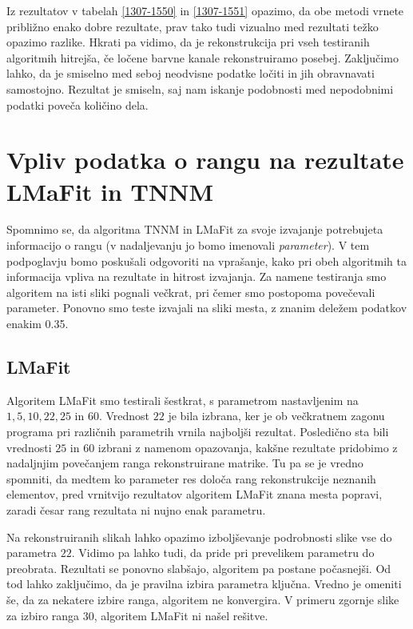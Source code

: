 \FloatBarrier

Iz rezultatov v  tabelah \ref{1307-1550} in \ref{1307-1551} opazimo, da obe metodi vrnete približno enako dobre rezultate, 
prav tako tudi vizualno med rezultati težko opazimo razlike.
Hkrati pa vidimo, da je rekonstrukcija pri vseh testiranih algoritmih hitrejša, če ločene barvne kanale rekonstruiramo posebej.  Zaključimo lahko, da je smiselno med seboj neodvisne podatke ločiti in jih obravnavati samostojno. Rezultat je smiseln, saj nam iskanje podobnosti med nepodobnimi podatki poveča količino dela.

\section{Vpliv podatka o rangu na rezultate LMaFit in TNNM} \label{1307-2253}
Spomnimo se, da algoritma TNNM in LMaFit za svoje izvajanje potrebujeta informacijo o rangu (v nadaljevanju jo bomo imenovali \textit{parameter}). V tem podpoglavju bomo poskušali odgovoriti na vprašanje, kako pri obeh algoritmih ta informacija vpliva na rezultate in hitrost izvajanja. Za namene testiranja smo algoritem na isti sliki pognali večkrat, pri čemer smo postopoma povečevali parameter. Ponovno smo teste izvajali na sliki mesta, z znanim deležem podatkov enakim 0.35.

\subsection{LMaFit}
Algoritem LMaFit smo testirali šestkrat, s parametrom nastavljenim na
$1, 5, 10, 22, 25$ in $60$. Vrednost $22$ je bila izbrana, ker je ob večkratnem zagonu programa pri različnih parametrih vrnila najboljši rezultat. Posledično sta bili vrednosti $25$ in $60$ izbrani z namenom opazovanja, kakšne rezultate pridobimo z nadaljnjim povečanjem ranga rekonstruirane matrike. Tu pa se je vredno spomniti, da medtem ko parameter res določa rang rekonstrukcije neznanih elementov, pred vrnitvijo rezultatov algoritem LMaFit znana mesta popravi, zaradi česar rang rezultata ni nujno enak parametru.

\FloatBarrier
Na rekonstruiranih slikah lahko opazimo izboljševanje podrobnosti slike vse do parametra $22$. Vidimo pa lahko tudi, da pride pri prevelikem parametru do preobrata. Rezultati se ponovno slabšajo, algoritem pa postane počasnejši. Od tod lahko zaključimo, da je pravilna izbira parametra ključna. Vredno je omeniti še, da za nekatere izbire ranga, algoritem ne konvergira. V primeru zgornje slike za izbiro ranga $30$, algoritem LMaFit ni našel rešitve.


